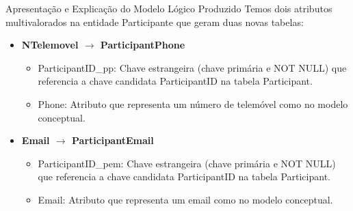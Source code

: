 \documentclass[compress,svgnames,handout,13.7pt]{beamer}
\begin{document}
\begin{frame}{Apresentação e Explicação do Modelo Lógico Produzido}
            Temos dois atributos multivalorados na entidade Participante que geram duas novas tabelas:
            \begin{itemize}
                \item{\textbf{NTelemovel $\rightarrow$ ParticipantPhone}}
                    \begin{itemize}
                        \item{ParticipantID\_pp:} Chave estrangeira (chave primária e NOT NULL) que referencia 
                        a chave candidata ParticipantID na tabela Participant.
                        \item{Phone:} Atributo que representa um número de telemóvel como no modelo conceptual.
                    \end{itemize}
                \item{\textbf{Email $\rightarrow$ ParticipantEmail}}
                    \begin{itemize}
                        \item{ParticipantID\_pem:} Chave estrangeira (chave primária e NOT NULL) que referencia a chave candidata ParticipantID na tabela Participant.
                        \item{Email:} Atributo que representa um email como no modelo conceptual.
                    \end{itemize}
            \end{itemize}
\end{frame}
\end{document}
